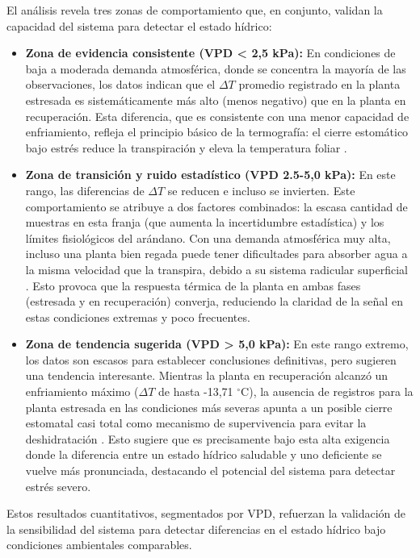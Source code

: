 \bigskip

El análisis revela tres zonas de comportamiento que, en conjunto, validan la capacidad del sistema para detectar el estado hídrico:
\begin{itemize}
    \item \textbf{Zona de evidencia consistente (VPD < 2,5 kPa):} En condiciones de baja a moderada demanda atmosférica, donde se concentra la mayoría de las observaciones, los datos indican que el $\Delta T$ promedio registrado en la planta estresada es sistemáticamente más alto (menos negativo) que en la planta en recuperación. Esta diferencia, que es consistente con una menor capacidad de enfriamiento, refleja el principio básico de la termografía: el cierre estomático bajo estrés reduce la transpiración y eleva la temperatura foliar .
    \item \textbf{Zona de transición y ruido estadístico (VPD 2.5-5,0 kPa):} En este rango, las diferencias de $\Delta T$ se reducen e incluso se invierten. Este comportamiento se atribuye a dos factores combinados: la escasa cantidad de muestras en esta franja (que aumenta la incertidumbre estadística) y los límites fisiológicos del arándano. Con una demanda atmosférica muy alta, incluso una planta bien regada puede tener dificultades para absorber agua a la misma velocidad que la transpira, debido a su sistema radicular superficial . Esto provoca que la respuesta térmica de la planta en ambas fases (estresada y en recuperación) converja, reduciendo la claridad de la señal en estas condiciones extremas y poco frecuentes.
    \item \textbf{Zona de tendencia sugerida (VPD > 5,0 kPa):} En este rango extremo, los datos son escasos para establecer conclusiones definitivas, pero sugieren una tendencia interesante. Mientras la planta en recuperación alcanzó un enfriamiento máximo ($\Delta T$ de hasta -13,71 $^{\circ}$C), la ausencia de registros para la planta estresada en las condiciones más severas apunta a un posible cierre estomatal casi total como mecanismo de supervivencia para evitar la deshidratación . Esto sugiere que es precisamente bajo esta alta exigencia donde la diferencia entre un estado hídrico saludable y uno deficiente se vuelve más pronunciada, destacando el potencial del sistema para detectar estrés severo.
\end{itemize}
Estos resultados cuantitativos, segmentados por VPD, refuerzan la validación de la sensibilidad del sistema para detectar diferencias en el estado hídrico bajo condiciones ambientales comparables.


